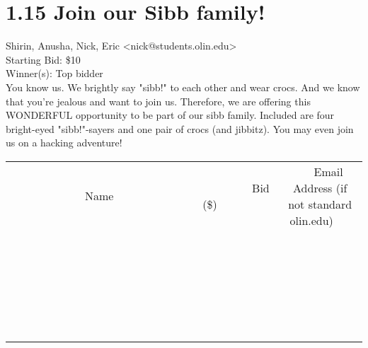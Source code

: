 \documentclass[11pt]{article}
\begin{document}
					\section*{1.15 Join our Sibb family!}
					Shirin, Anusha, Nick, Eric <nick@students.olin.edu> \\
					Starting Bid: \$10 \\
					Winner(s): Top bidder \\
					You know us. We brightly say "sibb!" to each other and wear crocs. And we know that you're jealous and want to join us. Therefore, we are offering this WONDERFUL opportunity to be part of our sibb family. Included are four bright-eyed "sibb!"-sayers and one pair of crocs (and jibbitz). You may even join us on a hacking adventure! \\
					[6ex]
					\begin{tabular}{c c c}
						~~~~~~~~~~~~~Name~~~~~~~~~~~~~ & ~~~~~~~~~Bid (\$)~~~~~~~~~ & ~~~Email Address (if not standard olin.edu)~~~ \\
				
 & & \\
\hline
 & & \\
\hline
 & & \\
\hline
 & & \\
\hline
 & & \\
\hline
 & & \\
\hline
 & & \\
\hline
 & & \\
\hline
 & & \\
\hline
 & & \\
\hline
 & & \\
\hline
 & & \\
\hline
 & & \\
\hline
 & & \\
\hline
 & & \\
\hline
 & & \\
\hline
 & & \\
\hline
 & & \\
\hline
 & & \\
\hline
 & & \\
\hline
 & & \\
\hline
 & & \\
\hline
 & & \\
\hline
 & & \\
\hline
 & & \\
\hline
 & & \\
\hline
					\end{tabular}
					\clearpage
				
\end{document}
